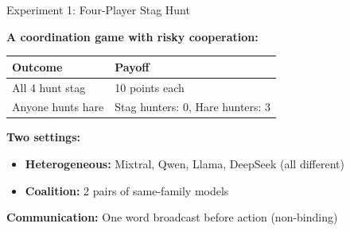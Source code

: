 \documentclass[aspectratio=169]{beamer}
\begin{document}
\begin{frame}{Experiment 1: Four-Player Stag Hunt}
  
  \textbf{A coordination game with risky cooperation:}
  
  \vspace{0.5em}
  \begin{table}
    \centering
    \begin{tabular}{ll}
      \toprule
      Outcome & Payoff \\
      \midrule
      All 4 hunt stag & 10 points each \\
      Anyone hunts hare & Stag hunters: 0, Hare hunters: 3 \\
      \bottomrule
    \end{tabular}
  \end{table}
  
  \vspace{1em}
  \textbf{Two settings:}
  \begin{itemize}
    \item \textbf{Heterogeneous:} Mixtral, Qwen, Llama, DeepSeek (all different)
    \item \textbf{Coalition:} 2 pairs of same-family models
  \end{itemize}
  
  \vspace{0.5em}
  \textbf{Communication:} One word broadcast before action (non-binding)

\end{frame}
\end{document}
